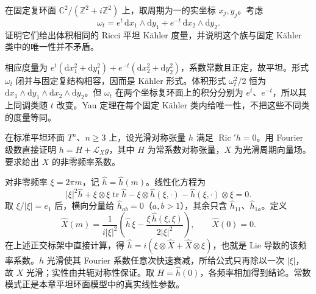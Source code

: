 \begin{exercise}\label{g3:ex:einstein-kahler-class-variation}
	在固定复环面 \(\mathbb C^2/(\mathbb Z^2+i\mathbb Z^2)\) 上，取周期为一的实坐标 \(x_j,y_j\)。考虑
	\[
		\omega_t=e^t\,\mathrm dx_1\wedge\mathrm dy_1
		+e^{-t}\,\mathrm dx_2\wedge\mathrm dy_2.
	\]
	证明它们给出体积相同的 Ricci 平坦 Kähler 度量，并说明这个族与固定 Kähler 类中的唯一性并不矛盾。
\end{exercise}
\begin{solution}
	相应度量为 \(e^t(\mathrm dx_1^2+\mathrm dy_1^2)+e^{-t}(\mathrm dx_2^2+\mathrm dy_2^2)\)，系数常数且正定，故平坦。形式 \(\omega_t\) 闭并与固定复结构相容，因而是 Kähler 形式。体积形式 \(\omega_t^2/2\) 恒为 \(\mathrm dx_1\wedge\mathrm dy_1\wedge\mathrm dx_2\wedge\mathrm dy_2\)。但 \(\omega_t\) 在两个坐标复环面上的积分分别为 \(e^t\)、\(e^{-t}\)，所以其上同调类随 \(t\) 改变。Yau 定理在每个固定 Kähler 类内给唯一性，不把这些不同类的度量等同。
\end{solution}

\begin{exercise}\label{g3:ex:einstein-flat-fourier-gauge}
	在标准平坦环面 \(T^n\)、\(n\ge3\) 上，设光滑对称张量 \(h\) 满足 \(\operatorname{Ric}'h=0\)。用 Fourier 级数直接证明 \(h=H+\mathcal L_Xg\)，其中 \(H\) 为常系数对称张量，\(X\) 为光滑周期向量场。要求给出 \(X\) 的非零频率系数。
\end{exercise}
\begin{solution}
	对非零频率 \(\xi=2\pi m\)，记 \(\widehat h=\widehat h(m)\)。线性化方程为
	\[
		|\xi|^2\widehat h+\xi\otimes\xi\operatorname{tr}\widehat h
		-\xi\otimes\widehat h(\xi,\cdot)
		-\widehat h(\xi,\cdot)\otimes\xi=0.
	\]
	取 \(\xi/|\xi|=e_1\) 后，横向分量给 \(\widehat h_{ab}=0\)（\(a,b>1\)），其余只含 \(\widehat h_{11}\)、\(\widehat h_{1a}\)。定义
	\[
		\widehat X(m)=\frac{1}{i|\xi|^2}
		\left(\widehat h\,\xi-
		\frac{\xi\,\widehat h(\xi,\xi)}{2|\xi|^2}\right),
		\qquad \widehat X(0)=0.
	\]
	在上述正交标架中直接计算，得 \(\widehat h=i(\xi\otimes\widehat X+\widehat X\otimes\xi)\)，也就是 Lie 导数的该频率系数。\(h\) 光滑使其 Fourier 系数任意次快速衰减，所给公式只再除以一次 \(|\xi|\)，故 \(X\) 光滑；实性由共轭对称性保证。取 \(H=\widehat h(0)\)，各频率相加得到结论。常数模式正是本章平坦环面模型中的真实线性参数。
\end{solution}
